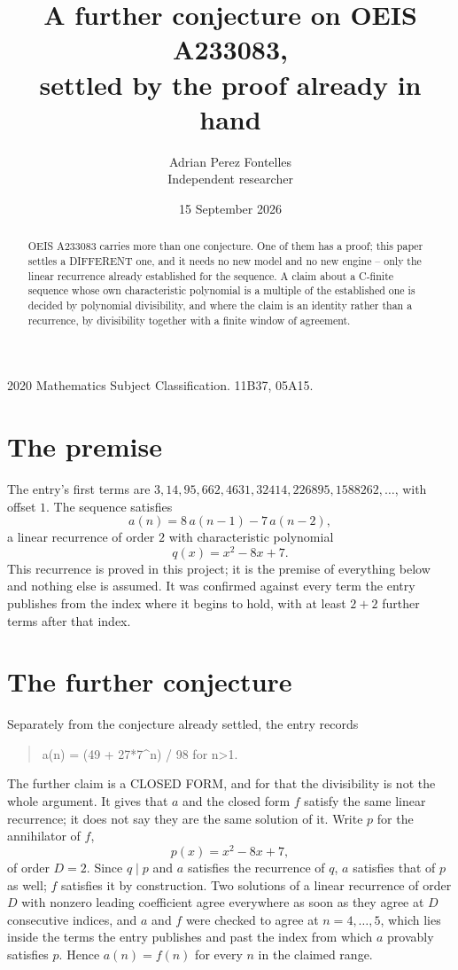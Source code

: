 \documentclass[11pt,a4paper]{article}
\title{A further conjecture on OEIS A233083,\\ \large settled by the proof already in hand}
\author{Adrian Perez Fontelles\\ \small Independent researcher}
\date{15 September 2026}
\theoremstyle{plain}
\theoremstyle{definition}
\begin{document}
\maketitle

\begin{abstract}
OEIS A233083 carries more than one conjecture. One of them has a proof; this paper settles a
DIFFERENT one, and it needs no new model and no new engine -- only the linear recurrence already
established for the sequence. A claim about a C-finite sequence whose own characteristic
polynomial is a multiple of the established one is decided by polynomial divisibility, and where
the claim is an identity rather than a recurrence, by divisibility together with a finite window
of agreement.
\end{abstract}

\noindent\small 2020 Mathematics Subject Classification. 11B37, 05A15.\normalsize

\section{The premise}

The entry's first terms are $3, 14, 95, 662, 4631, 32414, 226895, 1588262,\dots$, with offset $1$. The sequence satisfies
\[
  a(n)=8\,a(n-1) - 7\,a(n-2) ,
\]
a linear recurrence of order $2$ with characteristic polynomial
\[
  q(x)=x^{2} - 8 x + 7 .
\]
This recurrence is proved in this project; it is the premise of everything below and nothing else is assumed.
It was confirmed against every term the entry publishes from the index where it begins to hold,
with at least $2+2$ further terms after that index.

\section{The further conjecture}

Separately from the conjecture already settled, the entry records

\begin{quote}\raggedright a(n) = (49 + 27*7\^{}n) / 98 for n>1.\end{quote}

The further claim is a CLOSED FORM, and for that the divisibility is not the whole argument. It
gives that $a$ and the closed form $f$ satisfy the same linear recurrence; it does not say they
are the same solution of it. Write $p$ for the annihilator of $f$,
\[
  p(x)=x^{2} - 8 x + 7 ,
\]
of order $D=2$. Since $q\mid p$ and $a$ satisfies the recurrence of $q$, $a$ satisfies that of
$p$ as well; $f$ satisfies it by construction. Two solutions of a linear recurrence of order $D$
with nonzero leading coefficient agree everywhere as soon as they agree at $D$ consecutive
indices, and $a$ and $f$ were checked to agree at $n=4,\dots,5$,
which lies inside the terms the entry publishes and past the index from which $a$ provably
satisfies $p$. Hence $a(n)=f(n)$ for every $n$ in the claimed range.
\end{document}
